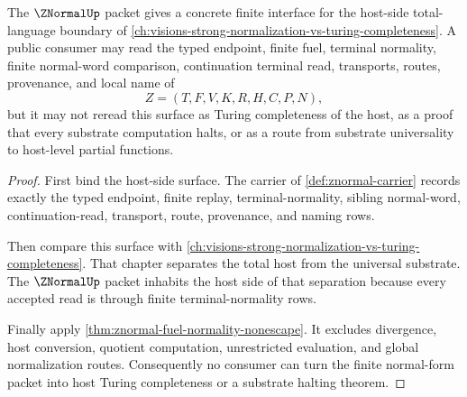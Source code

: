 \begin{theorem}
\label{thm:znormal-total-host-boundary}
The $\ZNormalUp$ packet gives a concrete finite interface for the host-side total-language boundary of \autoref{ch:visions-strong-normalization-vs-turing-completeness}. A public consumer may read the typed endpoint, finite fuel, terminal normality, finite normal-word comparison, continuation terminal read, transports, routes, provenance, and local name of
$$
Z=(T,F,V,K,R,H,C,P,N),
$$
but it may not reread this surface as Turing completeness of the host, as a proof that every substrate computation halts, or as a route from substrate universality to host-level partial functions.
\end{theorem}
\begin{proof}
First bind the host-side surface. The carrier of \autoref{def:znormal-carrier} records exactly the typed endpoint, finite replay, terminal-normality, sibling normal-word, continuation-read, transport, route, provenance, and naming rows.

Then compare this surface with \autoref{ch:visions-strong-normalization-vs-turing-completeness}. That chapter separates the total host from the universal substrate. The $\ZNormalUp$ packet inhabits the host side of that separation because every accepted read is through finite terminal-normality rows.

Finally apply \autoref{thm:znormal-fuel-normality-nonescape}. It excludes divergence, host conversion, quotient computation, unrestricted evaluation, and global normalization routes. Consequently no consumer can turn the finite normal-form packet into host Turing completeness or a substrate halting theorem.
\end{proof}

